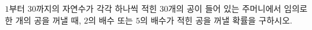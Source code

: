 $1$부터 $30$까지의 자연수가 각각 하나씩 적힌 30개의 공이 들어 있는 주머니에서 임의로 한 개의 공을 꺼낼 때, $2$의 배수 또는 $5$의 배수가 적힌 공을 꺼낼 확률을 구하시오.
